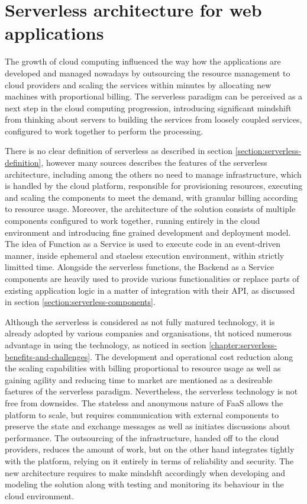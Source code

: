 \chapter{Serverless architecture for web applications}

The growth of cloud computing influenced the way how the applications are developed and managed nowadays by outsourcing the resource management to cloud providers and scaling the services within minutes by allocating new machines with proportional billing. The serverless paradigm can be perceived as a next step in the cloud computing progression, introducing significant mindshift from thinking about servers to building the services from loosely coupled services, configured to work together to perform the processing.

There is no clear definition of serverless as described in section \ref{section:serverless-definition}, however many sources describes the features of the serverless architecture, including among the others no need to manage infrastructure, which is handled by the cloud platform, responsible for provisioning resources, executing and scaling the components to meet the demand, with granular billing according to resource usage. Moreover, the architecture of the solution consists of multiple components configured to work together, running entirely in the cloud environment and introducing fine grained development and deployment model.
The idea of Function as a Service is used to execute code in an event-driven manner, inside ephemeral and staeless execution environment, within strictly limitted time. Alongside the serverless functions, the Backend as a Service components are heavily used to provide various functionalities or replace parts of existing application logic in a matter of integration with their API, as discussed in section \ref{section:serverless-components}. 

Although the serverless is considered as not fully matured technology, it is already adopted by various companies and organisations, tht noticed numerous advantage in using the technology, as noticed in section \ref{chapter:serverless-benefits-and-challenges}. 
The development and operational cost reduction along the scaling capabilities with billing proportional to resource usage as well as gaining agility and reducing time to market are mentioned as a desireable faetures of the serverless paradigm. 
Nevertheless, the serverless technology is not free from downsides. The stateless and anonymous nature of FaaS allows the platform to scale, but requires communication with external components to preserve the state and exchange messages as well as initiates discussions about performance. The outsourcing of the infrastructure, handed off to the cloud providers, reduces the amount of work, but on the other hand integrates tightly with the platform, relying on it entirely in terms of reliability and security. The new architecture requires to make mindshft accordingly when developing and modeling the solution along with testing and monitoring its behaviour in the cloud environment.


